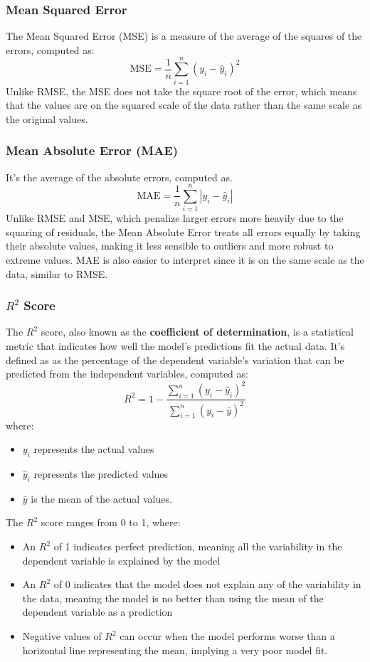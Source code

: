 \subsubsection{Mean Squared Error}
The Mean Squared Error (MSE) is a measure of the average of the squares of the errors, computed as:
\[
\text{MSE} = \frac{1}{n} \sum_{i=1}^{n} (y_i - \hat{y}_i)^2
\]
Unlike RMSE, the MSE does not take the square root of the error, which means that the values are on the squared scale of the data rather than the same scale as the original values. 

\subsubsection{Mean Absolute Error (MAE)}
It's the average of the absolute errors, computed as.
\[
\text{MAE} = \frac{1}{n} \sum_{i=1}^{n} |y_i - \hat{y}_i|
\]
Unlike RMSE and MSE, which penalize larger errors more heavily due to the squaring of residuals, the Mean Absolute Error treats all errors equally by taking their absolute values, making it less sensible to outliers and more robust to extreme values. MAE is also easier to interpret since it is on the same scale as the data, similar to RMSE. 

\subsubsection{$R^2$ Score}
The $R^2$ score, also known as the \textbf{coefficient of determination}, is a statistical metric that indicates how well the model's predictions fit the actual data. It's defined as  as the percentage of the dependent variable's variation that can be predicted from the independent variables, computed as:
\[
R^2 = 1 - \frac{\sum_{i=1}^{n} (y_i - \hat{y}_i)^2}{\sum_{i=1}^{n} (y_i - \bar{y})^2}
\]
where:
\begin{itemize}
    \item $y_i$ represents the actual values
    \item $\hat{y}_i$ represents the predicted values
    \item $\bar{y}$ is the mean of the actual values.
\end{itemize}
The $R^2$ score ranges from 0 to 1, where:
\begin{itemize}
    \item An $R^2$ of 1 indicates perfect prediction, meaning all the variability in the dependent variable is explained by the model
    \item An $R^2$ of 0 indicates that the model does not explain any of the variability in the data, meaning the model is no better than using the mean of the dependent variable as a prediction
    \item Negative values of $R^2$ can occur when the model performs worse than a horizontal line representing the mean, implying a very poor model fit.
\end{itemize}

